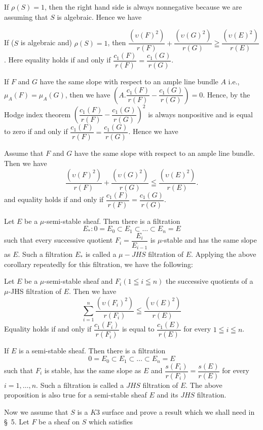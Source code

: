If $\rho(S)=1$, then the right hand side is always nonnegative
because we are assuming that $S$ is algebraic. Hence we have 

\begin{cor}\label{cor2.17}
If ($S$ is algebraic and) $\rho(S)=1$, then
$\dfrac{\left(\upsilon(F)^{2}\right)}{r(F)}+\dfrac{\left(\upsilon(G)^{2}\right)
}{r(G)}\geqq \dfrac{\left(\upsilon(E)^{2}\right)}{r(E)}$. Here equality
holds if and only if $\dfrac{c_1(F)}{r(F)}=\dfrac{c_1(G)}{r(G)}$.
\end{cor}

If $F$ and $G$ have the same slope with respect to an ample line
bundle $A$ i.e., $\mu_A(F)=\mu_A(G)$, then we have
$\left(A.\dfrac{c_1(F)}{r(F)}-\dfrac{c_1(G)}{r(G)}\right)=0$. Hence,
by the Hodge index theorem
$\left(\dfrac{c_1(F)}{r(F)}-\dfrac{c_1(G)}{r(G)}\right)^{2}$ is always
nonpositive and is equal to zero if and only if
$\dfrac{c_1(F)}{r(F)}=\dfrac{c_1(G)}{r(G)}$. Hence we have 

\begin{cor}\label{cor2.18}\pageoriginale
Assume that $F$ and $G$ have the same slope with respect to an ample
line bundle. Then we have 
$$
\dfrac{\left(\upsilon(F)^{2}\right)}{r(F)}+\dfrac{\left(\upsilon(G)^{2}\right)}{r(G)}\leqq \dfrac{\left(\upsilon(E)^{2}\right)}{r(E)}. 
$$
and equality holds if and only if
$\dfrac{c_1(F)}{r(F)}=\dfrac{c_1(G)}{r(G)}$. 
\end{cor}

Let $E$ be a $\mu$-semi-stable sheaf. Then there is a filtration 
$$
E_{\ast}:0=E_0\subset E_1\subset\ldots\subset E_n=E
$$
such that every successive quotient $F_i=\dfrac{E_i}{E_{i-1}}$ is
$\mu$-stable and has the same slope as $E$. Such a filtration
$E_{\ast}$ is called a $\mu-JHS$ filtration of $E$. Applying the above
corollary repeatedly for this filtration, we have the following: 

\begin{Prop}\label{Prop2.19}
Let $E$ be a $\mu$-semi-stable sheaf and $F_i(1\leqq i\leqq n)$ the
successive quotients of a $\mu$-JHS filtration of $E$. Then we have 
$$
\sum\limits_{i=1}^{n}\dfrac{\left(\upsilon(F_i)^{2}\right)}{r(F_i)}\leqq \dfrac{\left(\upsilon(E)^{2}\right)}{r(E)}
$$ 
Equality holds if and only if $\dfrac{c_1(F_i)}{r(F_i)}$ is equal to
$\dfrac{c_1(E)}{r(E)}$ for every $1\leqq i\leqq n$. 
\end{Prop}

\begin{remark}\label{remark2.20}
If $E$ is a semi-stable sheaf. Then there is a filtration
$$
0=E_0\subset E_1\subset\ldots \subset E_n=E
$$\pageoriginale
such that $F_i$ is stable, has the same slope as $E$ and
$\dfrac{s(F_i)}{r(F_i)}=\dfrac{s(E)}{r(E)}$ for every $i=1,\ldots,n$.
Such a filtration is called a $JHS$ filtration of $E$. The above
proposition is also true for a semi-stable sheaf $E$ and its $JHS$
filtration.

Now we assume that $S$ is a $K3$ surface and prove a result which we
shall need in \S\ 5. Let $F$ be a sheaf on $S$ which satisfies 
\end{remark}

